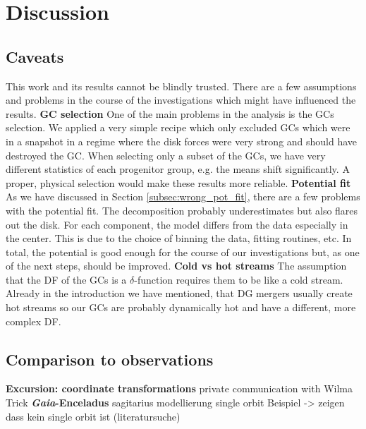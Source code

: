 \section{Discussion} \label{sec:Discussion}
\subsection{Caveats}
This work and its results cannot be blindly trusted. There are a few assumptions and problems in the course of the investigations which might have influenced the results.
\textbf{GC selection}
One of the main problems in the analysis is the \acp{GC} selection. We applied a very simple recipe which only excluded \acp{GC} which were in a snapshot in a regime where the disk forces were very strong and should have destroyed the \ac{GC}. When selecting only a subset of the \acp{GC}, we have very different statistics of each progenitor group, e.g. the means shift significantly. A proper, physical selection would make these results more reliable. 
\textbf{Potential fit}
As we have discussed in Section \ref{subsec:wrong_pot_fit}, there are a few problems with the potential fit. The decomposition probably underestimates but also flares out the disk. For each component, the model differs from the data especially in the center. This is due to the choice of binning the data, fitting routines, etc. In total, the potential is good enough for the course of our investigations but, as one of the next steps, should be improved.
\textbf{Cold vs hot streams}
The assumption that the \ac{DF} of the \acp{GC} is a $\delta$-function requires them to be like a cold stream. Already in the introduction we have mentioned, that \ac{DG} mergers usually create hot streams so our \acp{GC} are probably dynamically hot and have a different, more complex \ac{DF}.
\textbf{}
\subsection{Comparison to observations}

\textbf{Excursion: coordinate transformations}
private communication with Wilma Trick
\textbf{\textit{Gaia}-Enceladus} \cite{Enceladus....Helmi...2018}
sagitarius modellierung single orbit Beispiel
-> zeigen dass kein single orbit ist (literatursuche)

